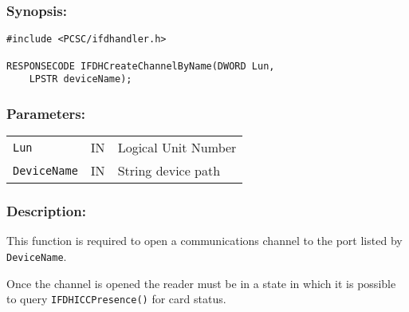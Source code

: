\documentclass[a4paper,12pt]{article}
\newcommand{\synopsis}{\subsubsection{Synopsis:}}
\newcommand{\parameters}{\subsubsection{Parameters:}}
\newcommand{\desc}{\subsubsection{Description:}}
\begin{document}
\synopsis
\begin{verbatim}
#include <PCSC/ifdhandler.h>

RESPONSECODE IFDHCreateChannelByName(DWORD Lun,
    LPSTR deviceName);
\end{verbatim}

\parameters

\begin{tabular}{lll}
\texttt{Lun} & IN & Logical Unit Number \\
\texttt{DeviceName} & IN & String device path \\
\end{tabular}


\desc

This function is required to open a communications channel to the port
listed by \texttt{DeviceName}.

Once the channel is opened the reader must be in a state in which it is
possible to query \texttt{IFDHICCPresence()} for card status.
\end{document}
